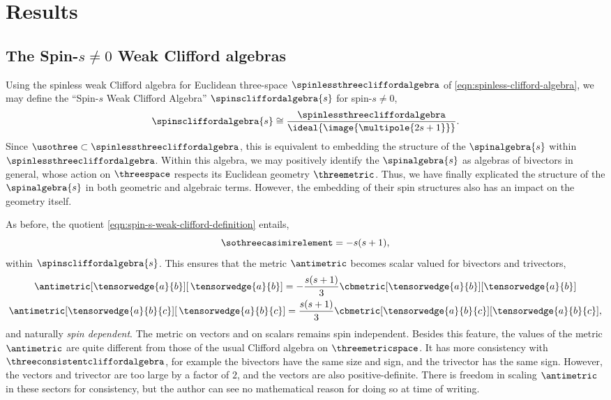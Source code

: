 \documentclass{article}
\begin{document}
\section{Results}\label{sec:results}

\subsection{The Spin-\texorpdfstring{$s\neq0$}{s=/=0} Weak Clifford algebras}

Using the spinless weak Clifford algebra for Euclidean three-space $\spinlessthreecliffordalgebra$ of \eqref{eqn:spinless-clifford-algebra}, we may define the \enquote{Spin-$s$ Weak Clifford Algebra} $\spinscliffordalgebra{s}$ for spin-$s\neq0$,
\begin{equation}\label{eqn:spin-s-weak-clifford-definition}
    \spinscliffordalgebra{s}\cong\frac{\spinlessthreecliffordalgebra}{\ideal{\image{\multipole{2s+1}}}}.
\end{equation}
\noindent Since $\usothree\subset\spinlessthreecliffordalgebra$, this is equivalent to embedding the structure of the $\spinalgebra{s}$ within $\spinlessthreecliffordalgebra$. Within this algebra, we may positively identify the $\spinalgebra{s}$ as algebras of bivectors in general, whose action on $\threespace$ respects its Euclidean geometry $\threemetric$. Thus, we have finally explicated the structure of the $\spinalgebra{s}$ in both geometric and algebraic terms. However, the embedding of their spin structures also has an impact on the geometry itself. 

As before, the quotient \eqref{eqn:spin-s-weak-clifford-definition} entails,
\begin{equation}\label{eqn:casimir-element-weak-clifford}
    \sothreecasimirelement=-s(s+1),
\end{equation}
\noindent within $\spinscliffordalgebra{s}$. This ensures that the metric $\antimetric$ becomes scalar valued for bivectors and trivectors,
\begin{subequations}
\begin{gather}
    \antimetric[\tensorwedge{a}{b}][\,\tensorwedge{a}{b}]=-\frac{s(s+1)}{3}\cbmetric[\tensorwedge{a}{b}][\tensorwedge{a}{b}]\\
    \antimetric[\tensorwedge{a}{b}{c}][\,\tensorwedge{a}{b}{c}]=\frac{s(s+1)}{3}\cbmetric[\tensorwedge{a}{b}{c}][\tensorwedge{a}{b}{c}],
\end{gather}
\end{subequations}
\noindent and naturally \textit{spin dependent}. The metric on vectors and on scalars remains spin independent. Besides this feature, the values of the metric $\antimetric$ are quite different from those of the usual Clifford algebra on $\threemetricspace$. It has more consistency with $\threeconsistentcliffordalgebra$, for example the bivectors have the same size and sign, and the trivector has the same sign. However, the vectors and trivector are too large by a factor of $2$, and the vectors are also positive-definite. There is freedom in scaling $\antimetric$ in these sectors for consistency, but the author can see no mathematical reason for doing so at time of writing.
\end{document}
